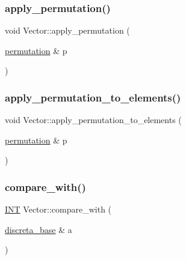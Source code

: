 \mbox{\label{class_vector_a1c243b57e3fb9c722f456576636f74d5}} 
\subsubsection{\texorpdfstring{apply\+\_\+permutation()}{apply\_permutation()}}
{\footnotesize\ttfamily void Vector\+::apply\+\_\+permutation (\begin{DoxyParamCaption}\item[{\mbox{\hyperlink{classpermutation}{permutation}} \&}]{p }\end{DoxyParamCaption})}

\mbox{\label{class_vector_a404f66398213840c0478550f24912519}} 
\subsubsection{\texorpdfstring{apply\+\_\+permutation\+\_\+to\+\_\+elements()}{apply\_permutation\_to\_elements()}}
{\footnotesize\ttfamily void Vector\+::apply\+\_\+permutation\+\_\+to\+\_\+elements (\begin{DoxyParamCaption}\item[{\mbox{\hyperlink{classpermutation}{permutation}} \&}]{p }\end{DoxyParamCaption})}

\mbox{\label{class_vector_a5fc27308a2710188b16f92df56c79c55}} 
\subsubsection{\texorpdfstring{compare\+\_\+with()}{compare\_with()}}
{\footnotesize\ttfamily \mbox{\hyperlink{galois_8h_a09fddde158a3a20bd2dcadb609de11dc}{I\+NT}} Vector\+::compare\+\_\+with (\begin{DoxyParamCaption}\item[{\mbox{\hyperlink{classdiscreta__base}{discreta\+\_\+base}} \&}]{a }\end{DoxyParamCaption})\hspace{0.3cm}{\ttfamily [virtual]}}




